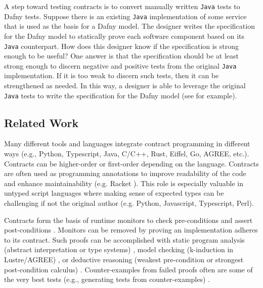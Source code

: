 \documentclass[11pt,onecolumn,notitlepage]{article}
\begin{document}
A step toward testing contracts is to convert manually written \texttt{Java} tests to Dafny tests. Suppose there is an existing \texttt{Java} implementation of some service that is used as the basis for a Dafny model. The designer writes the specification for the Dafny model to statically prove each software component based on its \texttt{Java} counterpart. How does this designer know if the specification is strong enough to be useful? One answer is that the specification should be at least strong enough to discern negative and positive tests from the original \texttt{Java} implementation. If it is too weak to discern such tests, then it can be strengthened as needed. In this way, a designer is able to leverage the original \texttt{Java} tests to write the specification for the Dafny model (see \cite{repo} for example).
 
\subsection*{Related Work}

Many different tools and languages integrate contract programming in different ways (e.g., Python, Typescript, Java, C/C++, Rust, Eiffel, Go, AGREE, etc.). Contracts can be higher-order or first-order depending on the language. Contracts are often used as programming annotations to improve readability of the code and enhance maintainability (e.g. Racket \cite{10.1145/3022670.2951930,10.1145/583852.581484,10.1145/2034574.2034800}). This role is especially valuable in untyped script languages where making sense of expected types can be challenging if not the original author (e.g. Python, Javascript, Typescript, Perl). 

Contracts form the basis of runtime monitors to check pre-conditions and assert post-conditions \cite{10.1007/978-3-642-28869-2_11}. Monitors can be removed by proving an implementation adheres to its contract. Such proofs can be accomplished with static program analysis (abstract interpretation or type systems) \cite{10.1145/3158139}, model checking (k-induction in Lustre/AGREE) \cite{10.1007/978-3-642-23702-7_26,10.1007/978-3-319-96142-2_3, 10.1007/978-3-642-28891-3_13, 10.1007/3-540-48249-0_34, 10.1007/978-3-319-41540-6_29}, or deductive reasoning (weakest pre-condition or strongest post-condition calculus) \cite{10.1007/3-540-45314-8_21, Huisman2016, 10.1007/978-3-642-27705-4_7, DBLP:series/lncs/10001, 10.1007/978-3-030-03421-4_4}. Counter-examples from failed proofs often are some of the very best tests (e.g., generating tests from counter-examples) \cite{Billeter:Thesis:2008}.
\end{document}
